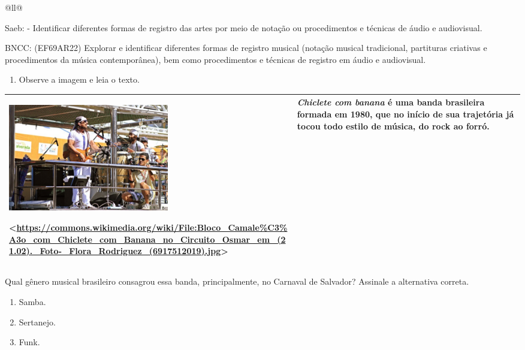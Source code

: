 \begin{itemize}
\begin{itemize}
\begin{escolha}[]{@{}ll@{}}
{{{{{{{{Saeb: - Identificar diferentes formas de registro das artes por meio de
notação ou procedimentos e técnicas de áudio e audiovisual.

BNCC: (EF69AR22) Explorar e identificar diferentes formas de registro
musical (notação musical tradicional, partituras criativas e
procedimentos da música contemporânea), bem como procedimentos e
técnicas de registro em áudio e audiovisual.

\begin{enumerate}
\def\labelenumi{\arabic{enumi}.}
\item
  Observe a imagem e leia o texto.
\end{enumerate}

\begin{longtable}[]{@{}ll@{}}
\toprule
\begin{minipage}[t]{0.48\columnwidth}\raggedright\strut
\includegraphics[width=2.76042in,height=1.83333in]{media/image35.jpeg}

\textless{}\url{https://commons.wikimedia.org/wiki/File:Bloco_Camale\%C3\%A3o_com_Chiclete_com_Banana_no_Circuito_Osmar_em_(21.02)._Foto-_Flora_Rodriguez_(6917512019).jpg}\textgreater{}\strut
\end{minipage} & \begin{minipage}[t]{0.48\columnwidth}\raggedright\strut
\emph{Chiclete com banana} é uma banda brasileira formada em 1980, que
no início de sua trajetória já tocou todo estilo de música, do rock ao
forró.\strut
\end{minipage}\tabularnewline
\bottomrule
\end{longtable}

Qual gênero musical brasileiro consagrou essa banda, principalmente, no
Carnaval de Salvador? Assinale a alternativa correta.

\begin{enumerate}
\def\labelenumi{\alph{enumi})}
\item
  Samba.
\item
  Sertanejo.
\item
  Funk.
\end{enumerate}

}}}}}}}}
\end{escolha}
\end{itemize}
\end{itemize}
